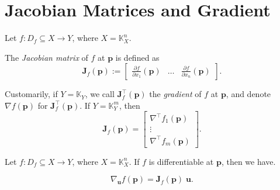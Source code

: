 \documentclass{article}
\begin{document}
\section{Jacobian Matrices and Gradient}


\begin{definition}
	Let $f: D_f \subseteq X \to Y$, where $X = \mathbb K_X^n$.
		
	The \textit{Jacobian matrix} of $f$ at $\mathbf p$ is defined as
	$$
	\mathbf J_{f}(\mathbf p) :=
	\left[
	\begin{matrix}
		\displaystyle \frac{\partial f}{\partial x_1}(\mathbf p) &\ldots & \displaystyle \frac{\partial f}{\partial x_n} (\mathbf p)
	\end{matrix}
	\right].
	$$
\end{definition}


\begin{note}
	Customarily, if $Y = \mathbb K_Y$, we call $\mathbf J_f^\top (\mathbf p)$ the \textit{gradient} of $f$ at $\mathbf p$, and denote $\nabla f(\mathbf p)$ for $\mathbf J_f^{\top} (\mathbf p)$. If $Y = \mathbb K_Y^m$, then
	$$
	\mathbf J_{f}(\mathbf p) =
	\left[
	\begin{matrix}
		\nabla^\top f_1(\mathbf p) \\
		\vdots \\
		\nabla^\top f_m(\mathbf p)
	\end{matrix}
	\right].
	$$
\end{note}


\begin{proposition}
	Let $f: D_f \subseteq X \to Y$, where $X = \mathbb K_X^n$. If $f$ is differentiable at $\mathbf p$, then we have.
	
	$$
	\nabla_{\mathbf u} f(\mathbf p) = \mathbf J_{f}(\mathbf p) \; \mathbf u.
	$$
\end{proposition}
\end{document}

